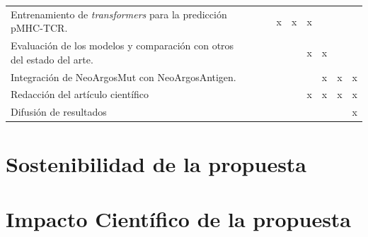 \documentclass[a4paper,11pt]{article}
\begin{document}
\begin{table}[H]
{{\begin{tabular}{|p{10cm}|l|c|c|c|c|c|c|c|c|}
				Entrenamiento de  \textit{transformers} para la predicción pMHC-TCR.  &                                      &                       &                        &             x            &    x                    & x                     & &                       &                                               \\
				Evaluación de los modelos y comparación con otros del estado del arte.  &                                      &                       &                        &                         &                        & x                     & x &                       &                                               \\
				Integración de NeoArgosMut con NeoArgosAntigen.  &                                      &                       &                        &                         &                        &                     & x &         x              &   x                                           \\
				
				Redacción del artículo científico &                                      &                       &                        &                         &                        & x                     & x & x                      & x                                              \\
				
				Difusión de resultados    &                              &                       &                        &                         &                       &                      &                       & & x                                             \\ \hline
			\end{tabular}
		}
	}
\end{table}





\section{Sostenibilidad de la propuesta}

\section{Impacto Científico de la propuesta}









	
\end{document}
